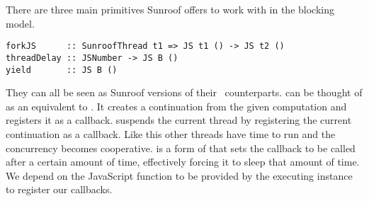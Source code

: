 \begin{comment}
The compiler offers two functions to choose in which
model the \JS-monad shall be compiled.
\begin{verbatim}
sunroofCompileJSA :: (Sunroof a) 
                  => CompilerOpts -> String -> JS A a -> IO String
sunroofCompileJSB :: CompilerOpts -> String -> JS B () -> IO String
\end{verbatim}
\end{comment}

There are three main primitives Sunroof offers to work with in
the blocking model.
\begin{verbatim}
forkJS      :: SunroofThread t1 => JS t1 () -> JS t2 ()
threadDelay :: JSNumber -> JS B ()
yield       :: JS B ()
\end{verbatim}
They can all be seen as Sunroof versions of their \IO~counterparts.
 can be thought of as an equivalent to .
It creates a continuation from the given computation and registers 
it as a callback.  suspends the current thread by 
registering the current continuation as a callback. Like this 
other threads have time to run and the concurrency becomes 
cooperative.  is a form of  that sets 
the callback to be called after a certain amount of time,
effectively forcing it to sleep that amount of time.
We depend on the JavaScript function  
to be provided
by the executing instance to register our callbacks.

